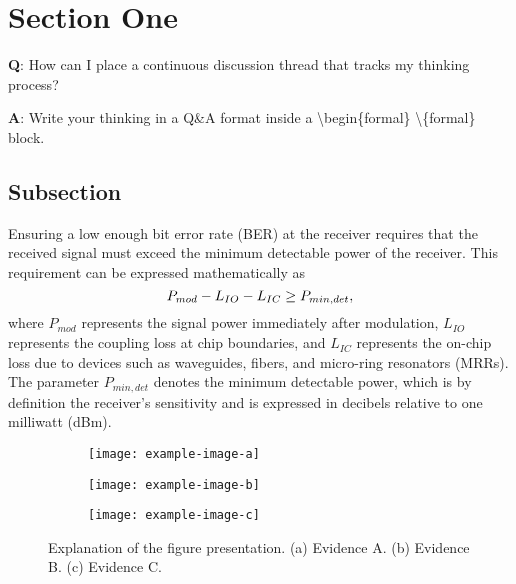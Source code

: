 \documentclass[../template.tex]{subfiles}
\begin{document}
\section{Section One}

\blindtext

\begin{formal}
	\textbf{Q}: How can I place a continuous discussion thread that tracks my thinking process?
	
	\noindent\textbf{A}: Write your thinking in a Q\&A format inside a \textbackslash begin\{formal\} \textbackslash\{formal\} block. 
\end{formal}

\subsection{Subsection}

Ensuring a low enough bit error rate (BER) at the receiver requires that the received signal must exceed the minimum detectable power of the receiver. This requirement can be expressed mathematically as
\begin{equation}
	P_{mod}-L_{IO}-L_{IC} \geq P_{min,det}, \tagaddtext{[dBm]}
	\label{eqn:opticalPowerBudget}
\end{equation}
where $P_{mod}$ represents the signal power immediately after modulation, $L_{IO}$ represents the coupling loss at chip boundaries, and $L_{IC}$ represents the on-chip loss due to devices such as waveguides, fibers, and micro-ring resonators (MRRs). The parameter $P_{min,det}$ denotes the minimum detectable power, which is by definition the receiver's sensitivity and is expressed in decibels relative to one milliwatt (dBm).

\begin{figure}[!hbt]
	\centering
	\begin{subfigure}[b]{0.38\textwidth}
		\texttt{[image: example-image-a]}
		\caption{}
		\label{fig:exampleImageA}		%
		\texttt{[image: example-image-b]}
		\caption{}
		\label{fig:exampleImageB}		%
	\end{subfigure}
	\begin{subfigure}[b]{0.6\textwidth}
		\centering
		\texttt{[image: example-image-c]}
		\caption{}
		\label{fig:exampleImageC}		%
	\end{subfigure}
	\caption{Explanation of the figure presentation. (a) Evidence A. (b) Evidence B. (c) Evidence C.}
	\label{fig:exampleImages}		%
\end{figure}
\end{document}
